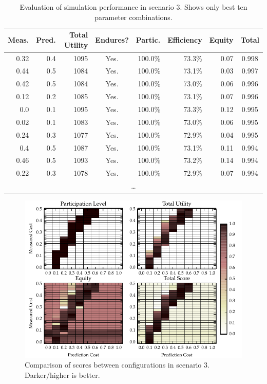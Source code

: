 \begin{table}
\centering
\caption{Evaluation of simulation performance in scenario 3. Shows only best ten parameter combinations.}\label{tab:staticfixed1}
\begin{tabular}{r|r||r|c|r|r|r||c}
Meas. & Pred. & Total Utility & Endures? & Partic. & Efficiency & Equity & Total \\
\hline
0.32 & 0.4 & 1095 & Yes. & 100.0\% & 73.3\% & 0.07 & 0.998 \\
0.44 & 0.5 & 1084 & Yes. & 100.0\% & 73.1\% & 0.03 & 0.997 \\
0.42 & 0.5 & 1084 & Yes. & 100.0\% & 73.0\% & 0.06 & 0.996 \\
0.12 & 0.2 & 1085 & Yes. & 100.0\% & 73.1\% & 0.07 & 0.996 \\
0.0 & 0.1 & 1095 & Yes. & 100.0\% & 73.3\% & 0.12 & 0.995 \\
0.02 & 0.1 & 1083 & Yes. & 100.0\% & 73.0\% & 0.06 & 0.995 \\
0.24 & 0.3 & 1077 & Yes. & 100.0\% & 72.9\% & 0.04 & 0.995 \\
0.4 & 0.5 & 1087 & Yes. & 100.0\% & 73.1\% & 0.11 & 0.994 \\
0.46 & 0.5 & 1093 & Yes. & 100.0\% & 73.2\% & 0.14 & 0.994 \\
0.22 & 0.3 & 1078 & Yes. & 100.0\% & 72.9\% & 0.07 & 0.994 \\
\multicolumn{8}{c}{\ldots} \\
\end{tabular}
\end{table}

\begin{figure}
\includegraphics{gfx/kc/static_highfixed_1.pdf} 
\caption[Comparison of scores between configurations in scenario 3.]{Comparison of scores between configurations in scenario 3. Darker/higher is better.}\label{fig:static_highfixed_1}
\end{figure}

